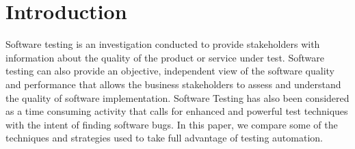 \section{Introduction}

Software testing is an investigation conducted to provide stakeholders with information about the quality of the product or service under test. Software testing can also provide an objective, independent view of the software quality and performance that allows the business stakeholders to assess and understand the quality of software implementation. Software Testing has also been considered as a time consuming activity that calls for enhanced and powerful test techniques with the intent of finding software bugs. In this paper, we compare some of the techniques and strategies used to take full advantage of testing automation.

